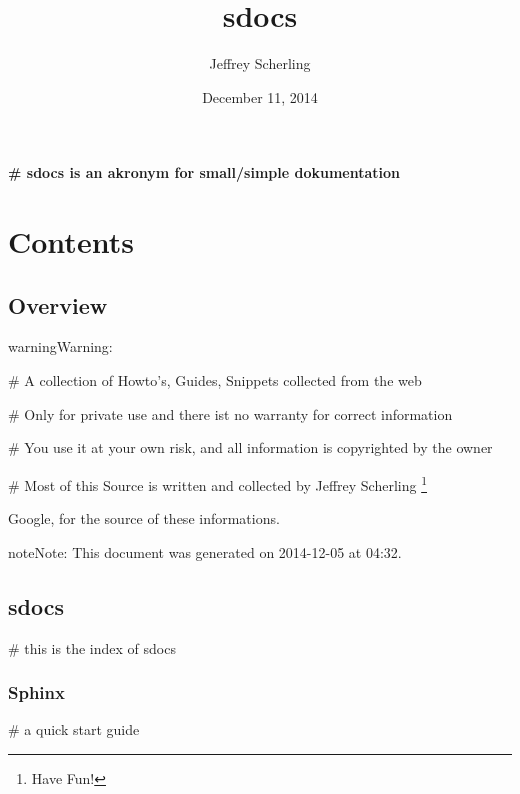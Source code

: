 \documentclass[letterpaper,10pt,english]{sphinxmanual}
\title{sdocs}
\date{December 11, 2014}
\author{Jeffrey Scherling}
\begin{document}
\maketitle
\tableofcontents
{}\label{index::doc}


\textbf{\# sdocs is an akronym for small/simple dokumentation}


\chapter{Contents}
\label{index:welcome-to-sdocs}\label{index:contents}

\section{Overview}
\label{sdocs/overview:overview}\label{sdocs/overview::doc}
\begin{notice}{warning}{Warning:}
\begin{DUlineblock}{0em}
\item[] \# A collection of Howto's, Guides, Snippets collected from the web
\item[] \# Only for private use and there ist no warranty for correct information
\item[] \# You use it at your own risk, and all information is copyrighted by the owner
\item[] \# Most of this Source is written and collected by Jeffrey Scherling \footnote{
Have Fun!
}
\end{DUlineblock}
\end{notice}




Google, for the source of these informations.



\begin{notice}{note}{Note:}
This document was generated on 2014-12-05 at 04:32.
\end{notice}


\section{sdocs}
\label{sdocs/index_sdocs::doc}\label{sdocs/index_sdocs:sdocs}
\# this is the index of sdocs


\subsection{Sphinx}
\label{sdocs/sphinx/sphinx:sphinx}\label{sdocs/sphinx/sphinx::doc}
\# a quick start guide
\end{document}
